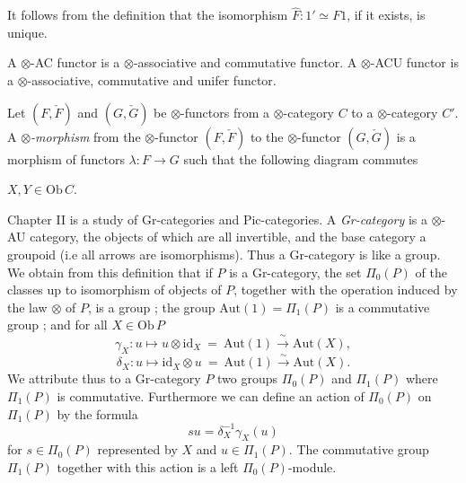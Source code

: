 \documentclass[11pt,a4paper]{article}
\begin{document}


It follows from the definition that the isomorphism $\hat{F} : 1' \simeq
F1$, if it exists, is unique.

A $\otimes$-AC functor is a $\otimes$-associative and commutative functor.
A $\otimes$-ACU functor is a $\otimes$-associative, commutative and
unifer functor.

Let $(F, \check{F})$ and $(G, \check{G})$ be $\otimes$-functors from a
$\otimes$-category $C$ to a $\otimes$-category $C'$. A
\emph{$\otimes$-morphism} from the $\otimes$-functor $(F, \check{F})$ to
the $\otimes$-functor $(G, \check{G})$ is a morphism of functors $\lambda
: F \to G$ such that the following diagram commutes


$X, Y \in \mathrm{Ob}\,C$.

Chapter II is a study of Gr-categories and Pic-categories. A
\emph{Gr-category} is a $\otimes$-AU category, the objects of which are
all invertible, and the base category a groupoid (i.e all arrows are
isomorphisms). Thus a Gr-category is like a group. We obtain from this
definition that if $P$ is a Gr-category, the set $\Pi_{0}(P)$ of the
classes up to isomorphism of objects of $P$, together with the operation
induced by the law $\otimes$ of $P$, is a group ; the group
$\mathrm{Aut}(1) = \Pi_{1}(P)$ is a commutative group ; and for all $X \in
\mathrm{Ob}\,P$
\[
\gamma_{X} : u \longmapsto u \otimes \mathrm{id}_{X} \ = \
\mathrm{Aut}(1) \xrightarrow{\ \sim\ } \mathrm{Aut}(X),
\]
\[
\delta_{X} : u \longmapsto \mathrm{id}_{X} \otimes u \ = \
\mathrm{Aut}(1) \xrightarrow{\ \sim\ } \mathrm{Aut}(X).
\]
We attribute thus to a Gr-category $P$ two groups $\Pi_{0}(P)$ and
$\Pi_{1}(P)$ where $\Pi_{1}(P)$ is commutative. Furthermore we can define
an action of $\Pi_{0}(P)$ on $\Pi_{1}(P)$ by the formula
\[
su = \delta_{X}^{-1} \gamma_{X}(u)
\]
for $s \in \Pi_{0}(P)$ represented by $X$ and $u \in \Pi_{1}(P)$. The
commutative group $\Pi_{1}(P)$ together with this action is a left
$\Pi_{0}(P)$-module.
\end{document}
